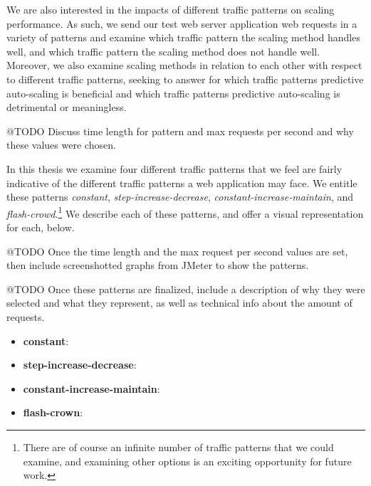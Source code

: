 We are also interested in the impacts of different traffic patterns on scaling
performance. As such, we send our test web server application web requests in a
variety of patterns and examine which traffic pattern the scaling method handles
well, and which traffic pattern the scaling method does not handle well.
Moreover, we also examine scaling methods in relation to each other with respect
to different traffic patterns, seeking to answer for which traffic patterns
predictive auto-scaling is beneficial and which traffic patterns predictive
auto-scaling is detrimental or meaningless.

@TODO Discuss time length for pattern and max requests per second and why these
values were chosen.

In this thesis we examine four different traffic patterns that we feel are
fairly indicative of the different traffic patterns a web application may face.
We entitle these patterns \textit{constant},
\textit{step-increase-decrease}, \textit{constant-increase-maintain}, and
\textit{flash-crowd}.\footnote{There are of course an infinite number of traffic
patterns that we could examine, and examining other options is an exciting
opportunity for future work.} We describe each of these patterns, and offer a
visual representation for each, below.

@TODO Once the time length and the max request per second values are set, then
include screenshotted graphs from JMeter to show the patterns.

@TODO Once these patterns are finalized, include a description of why they were
selected and what they represent, as well as technical info about the amount of
requests.

\begin{itemize}
  \item \textbf{constant}:
  \item \textbf{step-increase-decrease}:
  \item \textbf{constant-increase-maintain}:
  \item \textbf{flash-crown}:
\end{itemize}
